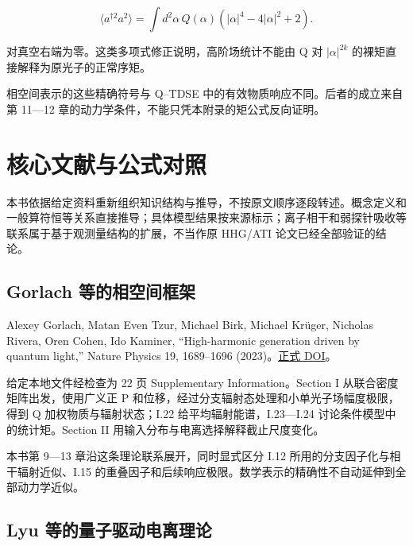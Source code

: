 \documentclass[UTF8,a4paper,zihao=-4,openany,fontset=fandol]{ctexbook}
\begin{document}
\begin{equation*}
\langle a^{\dagger2}a^2\rangle
=\int d^2\alpha\,Q(\alpha)
\left(|\alpha|^4-4|\alpha|^2+2\right).
\tag{D.1}\label{eq:D.1}
\end{equation*}


对真空右端为零。这类多项式修正说明，高阶场统计不能由 Q 对 $|\alpha|^{2k}$ 的裸矩直接解释为原光子的正常序矩。



相空间表示的这些精确符号与 Q–TDSE 中的有效物质响应不同。后者的成立来自第 11—12 章的动力学条件，不能只凭本附录的矩公式反向证明。



\chapter{核心文献与公式对照}\label{ch:E}


本书依据给定资料重新组织知识结构与推导，不按原文顺序逐段转述。概念定义和一般算符恒等关系直接推导；具体模型结果按来源标示；离子相干和弱探针吸收等联系属于基于观测量结构的扩展，不当作原 HHG/ATI 论文已经全部验证的结论。



\section{Gorlach 等的相空间框架}\label{sec:E:1}


Alexey Gorlach, Matan Even Tzur, Michael Birk, Michael Krüger, Nicholas Rivera, Oren Cohen, Ido Kaminer, “High-harmonic generation driven by quantum light,” Nature Physics 19, 1689–1696 (2023)。\href{https://doi.org/10.1038/s41567-023-02127-y}{正式 DOI}。



给定本地文件经检查为 22 页 Supplementary Information。Section I 从联合密度矩阵出发，使用广义正 P 和位移，经过分支辐射态处理和小单光子场幅度极限，得到 Q 加权物质与辐射状态；I.22 给平均辐射能谱，I.23—I.24 讨论条件模型中的统计矩。Section II 用输入分布与电离选择解释截止尺度变化。



本书第 9—13 章沿这条理论联系展开，同时显式区分 I.12 所用的分支因子化与相干辐射近似、I.15 的重叠因子和后续响应极限。数学表示的精确性不自动延伸到全部动力学近似。



\section{Lyu 等的量子驱动电离理论}\label{sec:E:2}
\end{document}
